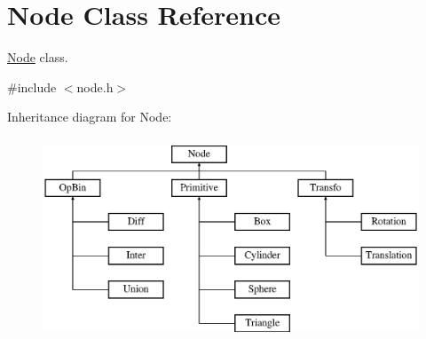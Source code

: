 \hypertarget{class_node}{
\section{\-Node \-Class \-Reference}
\label{class_node}
}


\hyperlink{class_node}{\-Node} class.  




{\ttfamily \#include $<$node.\-h$>$}

\-Inheritance diagram for \-Node\-:\begin{figure}[H]
\begin{center}
\leavevmode
\includegraphics[height=6.000000cm]{class_node}
\end{center}
\end{figure}
